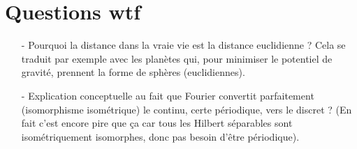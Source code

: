 \documentclass[11pt,a4paper]{article}
\begin{document}
\section{Questions wtf}
\begin{itemize}
\item[-] Pourquoi la distance dans la vraie vie est la distance euclidienne ? Cela se traduit par exemple avec les planètes qui, pour minimiser le potentiel de gravité, prennent la forme de sphères (euclidiennes). \\
\item[-] Explication conceptuelle au fait que Fourier convertit parfaitement (isomorphisme isométrique) le continu, certe périodique, vers le discret ? (En fait c'est encore pire que ça car tous les Hilbert séparables sont isométriquement isomorphes, donc pas besoin d'être périodique).
\end{itemize}
\end{document}
